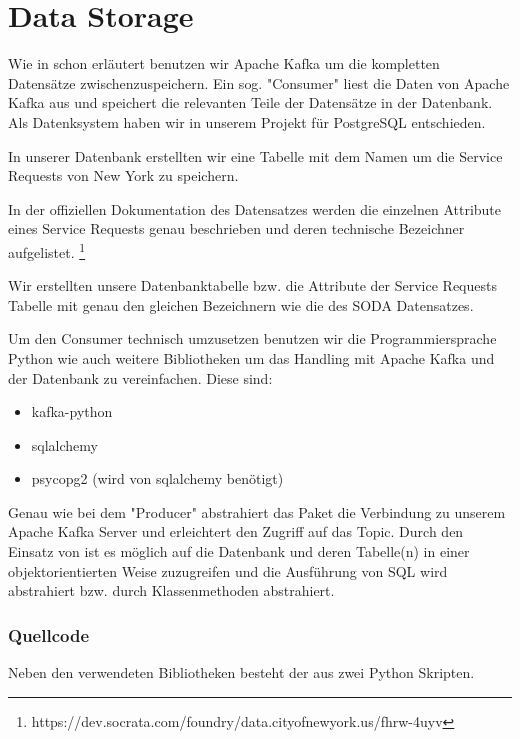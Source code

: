 \section{Data Storage}

Wie in  schon erläutert benutzen wir Apache Kafka um die kompletten Datensätze zwischenzuspeichern.
Ein sog. "Consumer" liest die Daten von Apache Kafka aus und speichert die relevanten Teile der Datensätze in der Datenbank.
Als Datenksystem haben wir in unserem Projekt für PostgreSQL entschieden.

In unserer Datenbank erstellten wir eine Tabelle mit dem Namen  um die Service Requests von New York zu speichern.

In der offiziellen Dokumentation des Datensatzes werden die einzelnen Attribute
eines Service Requests genau beschrieben und deren technische Bezeichner aufgelistet.
\footnote{https://dev.socrata.com/foundry/data.cityofnewyork.us/fhrw-4uyv}

Wir erstellten unsere Datenbanktabelle bzw. die Attribute der Service Requests Tabelle mit
genau den gleichen Bezeichnern wie die des \ac{SODA} Datensatzes.

Um den Consumer technisch umzusetzen benutzen wir die Programmiersprache Python wie auch weitere Bibliotheken um das Handling mit Apache Kafka
und der Datenbank zu vereinfachen.
Diese sind:

\begin{itemize}
  \item kafka-python
  \item sqlalchemy
  \item psycopg2 (wird von sqlalchemy benötigt)
\end{itemize}

Genau wie bei dem "Producer" abstrahiert das Paket  die Verbindung zu unserem Apache Kafka Server und erleichtert den Zugriff auf das Topic.
Durch den Einsatz von  ist es möglich auf die Datenbank und deren Tabelle(n) in einer objektorientierten Weise zuzugreifen
und die Ausführung von \ac{SQL} wird abstrahiert bzw. durch Klassenmethoden abstrahiert.

\subsubsection{Quellcode}
\label{subsub:quellcode_storage}
Neben den verwendeten Bibliotheken besteht der  aus zwei Python Skripten.

